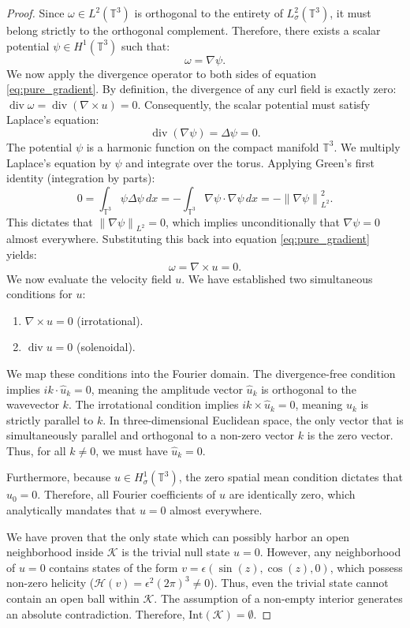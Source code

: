 \documentclass[12pt,a4paper]{article}
\theoremstyle{plain}
\theoremstyle{definition}
\theoremstyle{remark}
\newcommand{\T}{\mathbb{T}}
\newcommand{\norm}[1]{\left\|#1\right\|}
\newcommand{\dive}{\operatorname{div}}
\begin{document}
\begin{proof}
Since $\omega \in L^2(\T^3)$ is orthogonal to the entirety of $L^2_\sigma(\T^3)$, it must belong strictly to the orthogonal complement. Therefore, there exists a scalar potential $\psi \in H^1(\T^3)$ such that:
\begin{equation}
  \omega = \nabla \psi. \label{eq:pure_gradient}
\end{equation}
We now apply the divergence operator to both sides of equation \eqref{eq:pure_gradient}. By definition, the divergence of any curl field is exactly zero: $\dive \omega = \dive(\nabla \times u) = 0$. Consequently, the scalar potential must satisfy Laplace's equation:
\[
  \dive(\nabla \psi) = \Delta \psi = 0.
\]
The potential $\psi$ is a harmonic function on the compact manifold $\T^3$. We multiply Laplace's equation by $\psi$ and integrate over the torus. Applying Green's first identity (integration by parts):
\[
  0 = \int_{\T^3} \psi \Delta \psi \,dx = - \int_{\T^3} \nabla \psi \cdot \nabla \psi \,dx = - \norm{\nabla \psi}_{L^2}^2.
\]
This dictates that $\norm{\nabla \psi}_{L^2} = 0$, which implies unconditionally that $\nabla \psi = 0$ almost everywhere. Substituting this back into equation \eqref{eq:pure_gradient} yields:
\[
  \omega = \nabla \times u = 0.
\]
We now evaluate the velocity field $u$. We have established two simultaneous conditions for $u$:
\begin{enumerate}
  \item $\nabla \times u = 0$ (irrotational).
  \item $\dive u = 0$ (solenoidal).
\end{enumerate}
We map these conditions into the Fourier domain. The divergence-free condition implies $i k \cdot \hat{u}_k = 0$, meaning the amplitude vector $\hat{u}_k$ is orthogonal to the wavevector $k$. The irrotational condition implies $i k \times \hat{u}_k = 0$, meaning $\hat{u}_k$ is strictly parallel to $k$. 
In three-dimensional Euclidean space, the only vector that is simultaneously parallel and orthogonal to a non-zero vector $k$ is the zero vector. Thus, for all $k \neq 0$, we must have $\hat{u}_k = 0$. 

Furthermore, because $u \in H^1_\sigma(\T^3)$, the zero spatial mean condition dictates that $\hat{u}_0 = 0$. Therefore, all Fourier coefficients of $u$ are identically zero, which analytically mandates that $u = 0$ almost everywhere. 

We have proven that the only state which can possibly harbor an open neighborhood inside $\mathcal{K}$ is the trivial null state $u=0$. However, any neighborhood of $u=0$ contains states of the form $v = \epsilon (\sin(z), \cos(z), 0)$, which possess non-zero helicity ($\mathcal{H}(v) = \epsilon^2 (2\pi)^3 \neq 0$). Thus, even the trivial state cannot contain an open ball within $\mathcal{K}$. The assumption of a non-empty interior generates an absolute contradiction. Therefore, $\mathrm{Int}(\mathcal{K}) = \emptyset$.
\end{proof}
\end{document}

